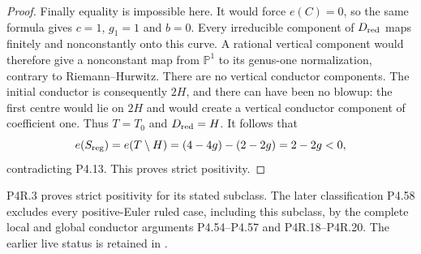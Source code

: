\begin{proof}
Finally equality is impossible here. It would force
$e(C)=0$, so the same formula gives $c=1$, $g_1=1$
and $b=0$. Every irreducible component of
$D_{\rm red}$ maps finitely and nonconstantly onto
this curve. A rational vertical component would
therefore give a nonconstant map from $\mathbb P^1$
to its genus-one normalization, contrary to
Riemann--Hurwitz. There are no vertical conductor
components. The initial conductor is consequently
$2H$, and there can have been no blowup: the first
centre would lie on $2H$ and would create a vertical
conductor component of coefficient one. Thus
$T=T_0$ and $D_{\rm red}=H$. It follows that
\[
 e(S_{\rm reg})=e(T\setminus H)
       =(4-4g)-(2-2g)=2-2g<0,
\]
contradicting P4.13. This proves strict positivity.
\end{proof}

P4R.3 proves strict positivity for its stated subclass.
The later classification P4.58 excludes every positive-Euler
ruled case, including this subclass, by the complete local
and global conductor arguments P4.54--P4.57 and P4R.18--P4R.20.
The earlier live status is retained in
.

